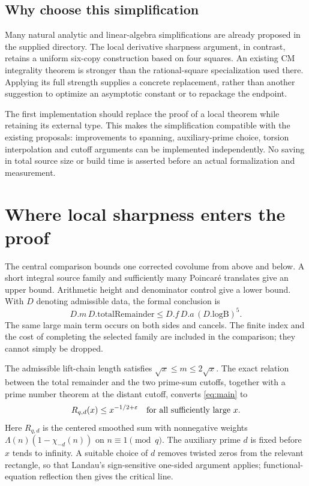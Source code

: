 \documentclass[11pt,letterpaper]{article}
\theoremstyle{remark}\newtheorem{remark}[theorem]{Remark}
\begin{document}
\subsection{Why choose this simplification}

Many natural analytic and linear-algebra simplifications are already
proposed in the supplied directory. The local derivative sharpness argument,
in contrast, retains a uniform six-copy construction based on four squares.
An existing CM integrality theorem is stronger than the rational-square
specialization used there. Applying its full strength supplies a concrete
replacement, rather than another suggestion to optimize an asymptotic
constant or to repackage the endpoint.

The first implementation should replace the proof of a local theorem while
retaining its external type. This makes the simplification compatible with
the existing proposals: improvements to spanning, auxiliary-prime choice,
torsion interpolation and cutoff arguments can be implemented independently.
No saving in total source size or build time is asserted before an actual
formalization and measurement.

\section{Where local sharpness enters the proof}
\label{sec:architecture}

The central comparison bounds one corrected covolume from above and below.
A short integral source family and sufficiently many Poincar\'e translates
give an upper bound. Arithmetic height and denominator control give a lower
bound. With $D$ denoting admissible data, the formal conclusion is
\begin{equation}
 D.m\,D.\mathrm{totalRemainder}
 \leq D.f\,D.a\,(D.\mathrm{logB})^5.
 \label{eq:main}
\end{equation}
The same large main term occurs on both sides and cancels. The finite index
and the cost of completing the selected family are included in the
comparison; they cannot simply be dropped.\cite{mainineq}

The admissible lift-chain length satisfies $\sqrt{x}\leq m\leq2\sqrt{x}$.
The exact relation between the total remainder and the two prime-sum cutoffs,
together with a prime number theorem at the distant cutoff, converts
\eqref{eq:main} to
\begin{equation}
 R_{q,d}(x)\leq x^{-1/2+\varepsilon}
 \quad\hbox{for all sufficiently large }x.
 \label{eq:onesided}
\end{equation}
Here $R_{q,d}$ is the centered smoothed sum with nonnegative weights
$\Lambda(n)(1-\chi_{-d}(n))$ on $n\equiv1\pmod q$.
The auxiliary prime $d$ is fixed before $x$ tends to infinity. A suitable
choice of $d$ removes twisted zeros from the relevant rectangle, so that
Landau's sign-sensitive one-sided argument applies; functional-equation
reflection then gives the critical line.\cite{endpoint}
\end{document}
